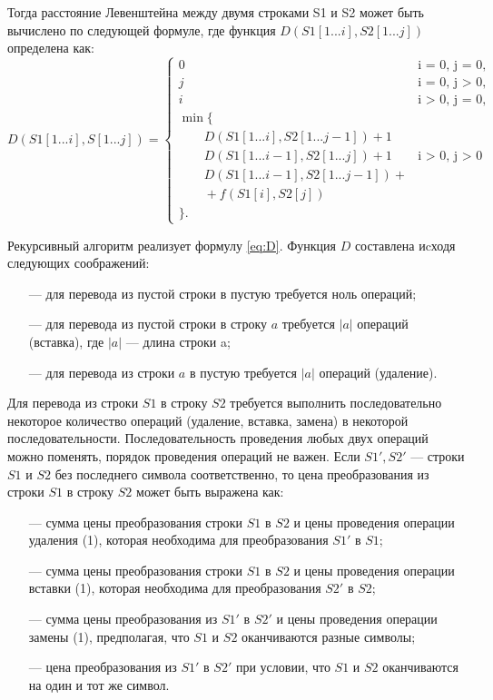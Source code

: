 Тогда расстояние Левенштейна между двумя строками S1 и S2 может быть вычислено по следующей формуле, где функция $D(S1[1...i], S2[1...j])$ определена как:
\begin{equation}
	\label{eq:D}
	D(S1[1...i], S[1...j]) = \begin{cases}
		0 &\text{i = 0, j = 0},\\
		j &\text{i = 0, j > 0},\\
		i &\text{i > 0, j = 0},\\
		\min \lbrace \\
			\qquad D(S1[1...i], S2[1...j-1]) + 1\\
			\qquad D(S1[1...i-1], S2[1...j]) + 1 &\text{i > 0, j > 0}\\
			\qquad D(S1[1...i-1], S2[1...j-1]) + \\
			\qquad + f(S1[i], S2[j]) \\
		\rbrace.
	\end{cases}
\end{equation}

Рекурсивный алгоритм реализует формулу \ref{eq:D}.
Функция $D$ составлена иcходя следующих соображений:
\begin{itemize}
	\item[---] для перевода из пустой строки в пустую требуется ноль операций;
	\item[---] для перевода из пустой строки в строку $a$ требуется $|a|$ операций (вставка), где $|a|$ --- длина строки a;
	\item[---] для перевода из строки $a$ в пустую требуется $|a|$ операций (удаление).
\end{itemize}
Для перевода из строки $S1$ в строку $S2$ требуется выполнить последовательно некоторое количество операций (удаление, вставка, замена) в некоторой последовательности. Последовательность проведения любых двух операций можно поменять, порядок проведения операций не важен. Если $S1', S2'$ --- строки $S1$ и $S2$ без последнего символа соответственно, то цена преобразования из строки $S1$ в строку $S2$ может быть выражена как:
	\begin{itemize}
		\item[---] сумма цены преобразования строки $S1$ в $S2$ и цены проведения операции удаления (1), которая необходима для преобразования $S1'$ в $S1$;
		\item[---] сумма цены преобразования строки $S1$ в $S2$  и цены проведения операции вставки (1), которая необходима для преобразования $S2'$ в $S2$;
		\item[---] сумма цены преобразования из $S1'$ в $S2'$ и цены проведения операции замены (1), предполагая, что $S1$ и $S2$ оканчиваются разные символы;
		\item[---] цена преобразования из $S1'$ в $S2'$ при условии, что $S1$ и $S2$ оканчиваются на один и тот же символ.
	\end{itemize}

